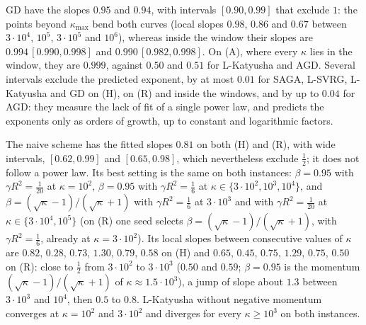 GD have the slopes $0.95$ and $0.94$, with intervals $[0.90,0.99]$ that exclude $1$: the points beyond $\kappa_{\max}$ bend
both curves (local slopes $0.98$, $0.86$ and $0.67$ between $3\cdot10^4$, $10^5$, $3\cdot10^5$ and $10^6$), whereas inside
the window their slopes are $0.994\,[0.990,0.998]$ and $0.990\,[0.982,0.998]$. On (A), where every $\kappa$ lies in the
window, they are $0.999$, against $0.50$ and $0.51$ for L-Katyusha and AGD. Several intervals exclude the predicted
exponent, by at most $0.01$ for SAGA, L-SVRG, L-Katyusha and GD on (H), on (R) and inside the windows, and by up to
$0.04$ for AGD: they measure the lack of fit of a single power law, and  predicts the exponents only as
orders of growth, up to constant and logarithmic factors.

The naive scheme has the fitted slopes $0.81$ on both (H) and (R), with wide intervals, $[0.62,0.99]$ and $[0.65,0.98]$,
which nevertheless exclude $\frac12$; it does not follow a power law. Its best setting is the same on both instances:
$\beta=0.95$ with $\gamma R^2=\frac1{20}$ at $\kappa=10^2$, $\beta=0.95$ with $\gamma R^2=\frac16$ at
$\kappa\in\{3\cdot10^2,10^3,10^4\}$, and $\beta=(\sqrt\kappa-1)/(\sqrt\kappa+1)$ with $\gamma R^2=\frac16$ at $3\cdot10^3$ and
with $\gamma R^2=\frac1{20}$ at $\kappa\in\{3\cdot10^4,10^5\}$ (on (R) one seed selects $\beta=(\sqrt\kappa-1)/(\sqrt\kappa+1)$,
with $\gamma R^2=\frac16$, already at $\kappa=3\cdot10^2$). Its local slopes between consecutive values of $\kappa$ are
$0.82$, $0.28$, $0.73$, $1.30$, $0.79$, $0.58$
on (H) and $0.65$, $0.45$, $0.75$, $1.29$, $0.75$, $0.50$ on (R): close to $\frac12$ from $3\cdot10^2$ to $3\cdot10^3$ ($0.50$
and $0.59$; $\beta=0.95$ is the momentum $(\sqrt\kappa-1)/(\sqrt\kappa+1)$ of $\kappa\approx1.5\cdot10^3$), a jump of slope
about $1.3$ between $3\cdot10^3$ and $10^4$, then $0.5$ to $0.8$. L-Katyusha without negative momentum converges at
$\kappa=10^2$ and $3\cdot10^2$ and diverges for every $\kappa\ge10^3$ on both instances.

